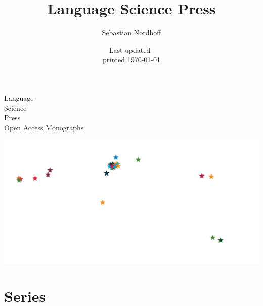 \documentclass[
notumble,
nofoldmark,
]{leaflet}
\title{Language Science Press}
\author{%
  Sebastian Nordhoff}
\date{Last updated~\docdate\\printed \today}
\begin{document}
\thispagestyle{empty}

\color{LIGHTGRAY}

 
\vspace*{2cm}
\parbox{\textwidth}{
\sffamily
\Huge {Language\\ Science\\ Press}\\
\Large Open Access Monographs
}
   


\newpage


\vspace*{-1.5cm}
\includegraphics[width=2.6\textwidth]{worldmapdots2.png}

\vspace*{-1.5cm}
\section{\sffamily\Large Series}

% 

\newcommand{\rightseries}[3]{   
  \parbox{.1\textwidth}{\texttt{[image: \#2.png]}}
  \parbox{.01\textwidth}{~} 
  \parbox{.7\textwidth}{\raggedright{\small\bfseries #1}\\{\scriptsize #3}}
  \parbox{.05\textwidth}{~\smallskip}\\[.5em]
}
\newcommand{\leftseries}[3]{   
  \parbox{.1\textwidth}{\texttt{[image: \#2.png]}}
  \parbox{.01\textwidth}{~} 
  \parbox{.7\textwidth}{\raggedright{\small\bfseries #1}\\{\scriptsize #3}}
  \parbox{.05\textwidth}{~\smallskip}\\[.5em]
}
\end{document}
